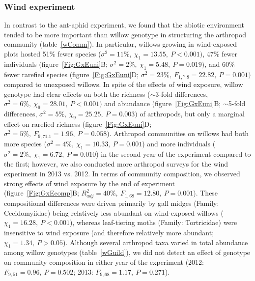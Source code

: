 \documentclass[11pt]{article}
\begin{document}
\subsubsection*{Wind experiment}

In contrast to the ant-aphid experiment, we found that the abiotic
environment tended to be more important than willow genotype in
structuring the arthropod community (table~\ref{wComm}). In particular, willows
growing in wind-exposed plots hosted 51\% fewer species
(\(\sigma^2=11\%,\ \chi_1=13.55,\ P<0.001)\), 47\% fewer individuals (figure~\ref{Fig:GxEuni}B; \(\sigma^2=2\%,\ \chi_1=5.48,\ P=0.019)\),
and 60\% fewer rarefied species (figure~\ref{Fig:GxEuni}D; \(\sigma^2=23\%,\ F_{1,7.8}=22.82,\ P=0.001)\) compared to
unexposed willows. In spite of the effects of wind exposure, willow
genotype had clear effects on both the richness ($\sim$3-fold
differences, \(\sigma^2=6\%,\ \chi_9=28.01,\ P<0.001)\) and abundance (figure~\ref{Fig:GxEuni}B;
$\sim$5-fold differences, \(\sigma^2=5\%,\ \chi_9=25.25,\ P=0.003)\) of arthropods,
but only a marginal effect on rarefied richness (figure~\ref{Fig:GxEuni}D;
\(\sigma^2=5\%,\ F_{9,71.1}=1.96,\ P=0.058\)). Arthropod communities on willows had both more
species (\(\sigma^2=4\%,\ \chi_1=10.33,\ P=0.001\)) and more individuals (\(\sigma^2=2\%,\ \chi_1=6.72,\ P=0.010\)) in
the second year of the experiment compared to the first; however, we
also conducted more arthropod surveys for the wind experiment in 2013
vs. 2012. In terms of community composition, we observed strong effects
of wind exposure by the end of experiment (figure~\ref{Fig:GxEcomp}B; \(R_{adj}^2=40\%,\ F_{1,68}=12.80,\ P=0.001\)).
These compositional differences were driven primarily by gall midges
(Family: Cecidomyiidae) being relatively less abundant on wind-exposed
willows (\(\chi_1=16.28,\ P<0.001\)), whereas leaf-tiering moths (Family:
Tortricidae) were insensitive to wind exposure (and therefore relatively
more abundant; \(\chi_1=1.34,\ P>0.05\)). Although several arthropod taxa
varied in total abundance among willow genotypes (table~\ref{wGuild}), we did not
detect an effect of genotype on community composition in either year of
the experiment (2012: \(F_{9,51}=0.96,\ P=0.502\); 2013: \(F_{9,68}=1.17,\ P=0.271\)).

\end{document}
